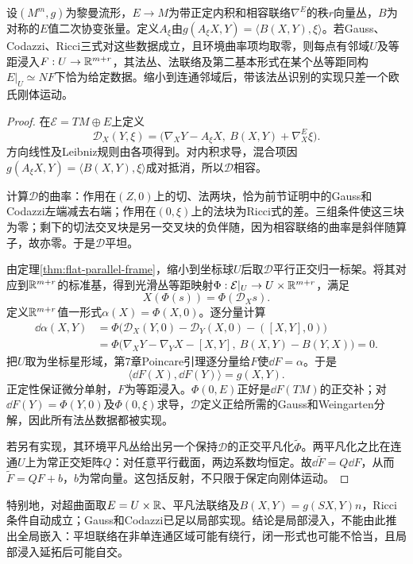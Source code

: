 \begin{theorem}[欧氏子流形基本定理的局部形式]\label{thm:local-immersion-reconstruction}
设$(M^m,g)$为黎曼流形，$E\to M$为带正定内积和相容联络$\nabla^E$的秩$r$向量丛，$B$为对称的$E$值二次协变张量。定义$A_\xi$由$g(A_\xi X,Y)=\langle B(X,Y),\xi\rangle$。若Gauss、Codazzi、Ricci三式对这些数据成立，且环境曲率项均取零，则每点有邻域$U$及等距浸入$F:U\to\mathbb{R}^{m+r}$，其法丛、法联络及第二基本形式在某个丛等距同构$E|_U\simeq NF$下恰为给定数据。缩小到连通邻域后，带该法丛识别的实现只差一个欧氏刚体运动。
\end{theorem}
\begin{proof}
在$\mathcal E=TM\oplus E$上定义
\[
 \mathcal D_X(Y,\xi)=
 \bigl(\nabla_XY-A_\xi X,\ B(X,Y)+\nabla_X^E\xi\bigr).
\]
方向线性及Leibniz规则由各项得到。对内积求导，混合项因$g(A_\xi X,Y)=\langle B(X,Y),\xi\rangle$成对抵消，所以$\mathcal D$相容。

计算$\mathcal D$的曲率：作用在$(Z,0)$上的切、法两块，恰为前节证明中的Gauss和Codazzi左端减去右端；作用在$(0,\xi)$上的法块为Ricci式的差。三组条件使这三块为零；剩下的切法交叉块是另一交叉块的负伴随，因为相容联络的曲率是斜伴随算子，故亦零。于是$\mathcal D$平坦。

由定理\ref{thm:flat-parallel-frame}，缩小到坐标球$U$后取$\mathcal D$平行正交归一标架。将其对应到$\mathbb{R}^{m+r}$的标准基，得到光滑丛等距映射$\Phi:\mathcal E|_U\to U\times\mathbb{R}^{m+r}$，满足
\[
 X(\Phi(s))=\Phi(\mathcal D_Xs).
\]
定义$\mathbb{R}^{m+r}$值一形式$\alpha(X)=\Phi(X,0)$。逐分量计算
\begin{align*}
 \dd\alpha(X,Y)
 &=\Phi\bigl(\mathcal D_X(Y,0)-\mathcal D_Y(X,0)-([X,Y],0)\bigr)\\
 &=\Phi\bigl(\nabla_XY-\nabla_YX-[X,Y],\ B(X,Y)-B(Y,X)\bigr)=0.
\end{align*}
把$U$取为坐标星形域，第7章Poincare引理逐分量给$F$使$\dd F=\alpha$。于是
\[
 \langle\dd F(X),\dd F(Y)\rangle=g(X,Y).
\]
正定性保证微分单射，$F$为等距浸入。$\Phi(0,E)$正好是$\dd F(TM)$的正交补；对$\dd F(Y)=\Phi(Y,0)$及$\Phi(0,\xi)$求导，$\mathcal D$定义正给所需的Gauss和Weingarten分解，因此所有法丛数据都被实现。

若另有实现，其环境平凡丛给出另一个保持$\mathcal D$的正交平凡化$\widetilde\Phi$。两平凡化之比在连通$U$上为常正交矩阵$Q$：对任意平行截面，两边系数均恒定。故$\dd\widetilde F=Q\dd F$，从而$\widetilde F=QF+b$，$b$为常向量。这包括反射，不只限于保定向刚体运动。
\end{proof}

特别地，对超曲面取$E=U\times\mathbb{R}$、平凡法联络及$B(X,Y)=g(SX,Y)n$，Ricci条件自动成立；Gauss和Codazzi已足以局部实现。结论是局部浸入，不能由此推出全局嵌入：平坦联络在非单连通区域可能有绕行，闭一形式也可能不恰当，且局部浸入延拓后可能自交。
